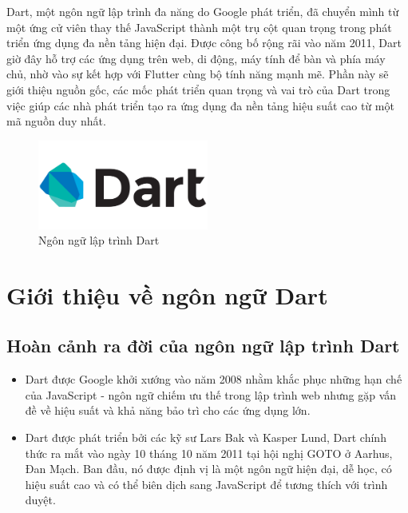 \documentclass[../DoAn.tex]{subfiles}
\numberwithin{figure}{chapter}
\begin{document}
Dart, một ngôn ngữ lập trình đa năng do Google phát triển, đã chuyển mình từ một ứng cử viên thay thế JavaScript thành một trụ cột quan trọng trong phát triển ứng dụng đa nền tảng hiện đại. Được công bố rộng rãi vào năm 2011, Dart giờ đây hỗ trợ các ứng dụng trên web, di động, máy tính để bàn và phía máy chủ, nhờ vào sự kết hợp với Flutter cùng bộ tính năng mạnh mẽ. Phần này sẽ giới thiệu nguồn gốc, các mốc phát triển quan trọng và vai trò của Dart trong việc giúp các nhà phát triển tạo ra ứng dụng đa nền tảng hiệu suất cao từ một mã nguồn duy nhất.

\begin{figure}[H]
    \centering
    \includegraphics[width=0.5\textwidth]{Hinhve/dartimg.png}
    \caption{Ngôn ngữ lập trình Dart}
    \label{fig:dartimg}
\end{figure}

\section{Giới thiệu về ngôn ngữ Dart}
\subsection{Hoàn cảnh ra đời của ngôn ngữ lập trình Dart}
\begin{itemize}
    \item Dart được Google khởi xướng vào năm 2008 nhằm khắc phục những hạn chế của JavaScript - ngôn ngữ chiếm ưu thế trong lập trình web nhưng gặp vấn đề về hiệu suất và khả năng bảo trì cho các ứng dụng lớn. 
    \item Dart được phát triển bởi các kỹ sư Lars Bak và Kasper Lund, Dart chính thức ra mắt vào ngày 10 tháng 10 năm 2011 tại hội nghị GOTO ở Aarhus, Đan Mạch. Ban đầu, nó được định vị là một ngôn ngữ hiện đại, dễ học, có hiệu suất cao và có thể biên dịch sang JavaScript để tương thích với trình duyệt.
\end{itemize}
\end{document}
